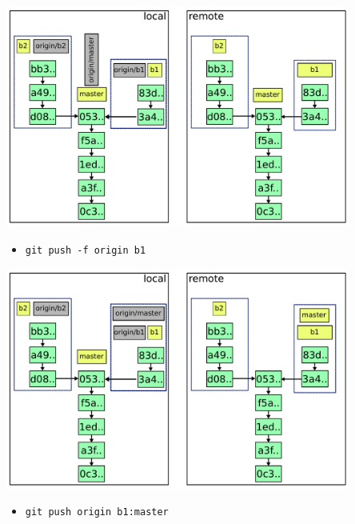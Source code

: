 \documentclass{beamer}
\begin{document}
\begin{frame}{}
  \centering
  \includegraphics[width=0.85\textwidth]{img/6.pdf}
  \begin{itemize}
  \small
  \item \lstinline|git push -f origin b1| \vspace{0.46cm} \\
  \end{itemize}
\end{frame}

\begin{frame}{}
  \centering
  \includegraphics[width=0.85\textwidth]{img/7.pdf}
  \begin{itemize}
  \small
  \item \lstinline|git push origin b1:master| \vspace{0.46cm} \\
  \end{itemize}
\end{frame}
\end{document}
